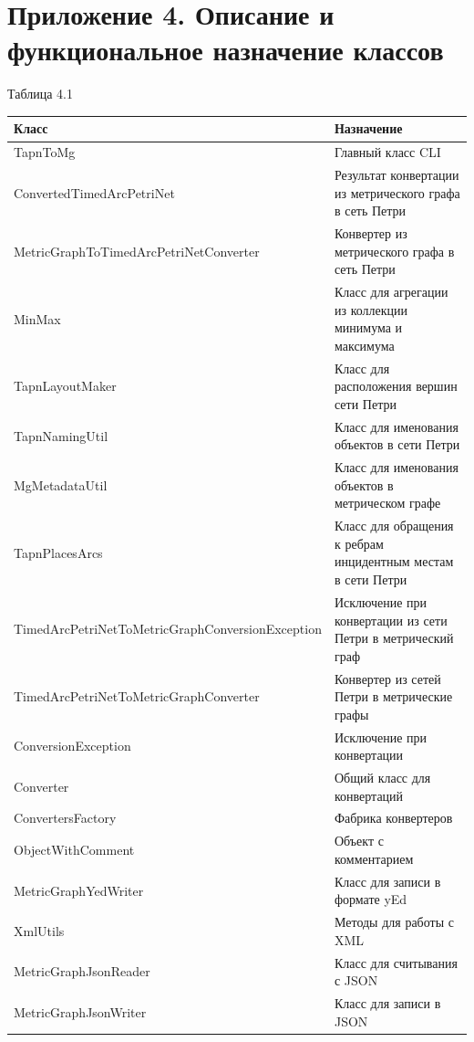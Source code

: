 \documentclass{../TechDoc}
\begin{document}
	\section*{Приложение 4. Описание и функциональное назначение
классов}
	\begin{flushright}
		Таблица 4.1
	\end{flushright}
	\begin{tabular}{|l|m{17em}|}
		\hline
		\textbf{Класс} & \textbf{Назначение} \\
		\hline
		TapnToMg & Главный класс CLI\\
		\hline
		ConvertedTimedArcPetriNet & Результат конвертации из метрического графа в сеть Петри\\
		\hline
		MetricGraphToTimedArcPetriNetConverter & Конвертер из метрического графа в сеть Петри\\
		\hline
		MinMax & Класс для агрегации из коллекции минимума и максимума\\
		\hline
		TapnLayoutMaker & Класс для расположения вершин сети Петри\\
		\hline
		TapnNamingUtil & Класс для именования объектов в сети Петри\\
		\hline
		MgMetadataUtil & Класс для именования объектов в метрическом графе\\
		\hline
		TapnPlacesArcs & Класс для обращения к ребрам инцидентным местам в сети Петри\\
		\hline
		TimedArcPetriNetToMetricGraphConversionException & Исключение при конвертации из сети Петри в метрический граф\\
		\hline
		TimedArcPetriNetToMetricGraphConverter & Конвертер из сетей Петри в метрические графы\\
		\hline
		ConversionException & Исключение при конвертации\\
		\hline
		Converter & Общий класс для конвертаций\\
		\hline
		ConvertersFactory & Фабрика конвертеров \\
		\hline
		ObjectWithComment & Объект с комментарием\\
		\hline
		MetricGraphYedWriter & Класс для записи в формате yEd\\
		\hline
		XmlUtils & Методы для работы с XML\\
		\hline
		MetricGraphJsonReader & Класс для считывания с JSON \\
		\hline
		MetricGraphJsonWriter & Класс для записи в JSON\\

\end{tabular}
\end{document}
